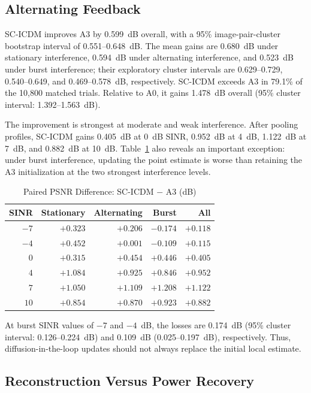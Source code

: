 \documentclass[conference]{IEEEtran}
\newcommand{\method}{SC-ICDM}
\begin{document}
\subsection{Alternating Feedback}

\method{} improves A3 by 0.599~dB overall, with a 95\% image-pair-cluster
bootstrap interval of 0.551--0.648~dB. The mean gains are 0.680~dB under
stationary interference, 0.594~dB under alternating interference, and
0.523~dB under burst interference; their exploratory cluster intervals are
0.629--0.729, 0.540--0.649, and 0.469--0.578~dB, respectively. \method{}
exceeds A3 in 79.1\% of the 10,800 matched trials. Relative to A0, it gains
1.478~dB overall (95\% cluster interval: 1.392--1.563~dB).

The improvement is strongest at moderate and weak interference. After
pooling profiles, \method{} gains 0.405~dB at 0~dB SINR, 0.952~dB at 4~dB,
1.122~dB at 7~dB, and 0.882~dB at 10~dB. Table~\ref{tab:sinr_gain} also
reveals an important exception: under burst interference, updating the point
estimate is worse than retaining the A3 initialization at the two strongest
interference levels.

\begin{table}[t]
\caption{Paired PSNR Difference: \method{} $-$ A3 (dB)}
\label{tab:sinr_gain}
\centering
\setlength{\tabcolsep}{5.0pt}
\begin{tabular}{rrrrr}
\toprule
SINR & Stationary & Alternating & Burst & All \\
\midrule
$-7$ & $+0.323$ & $+0.206$ & $\mathbf{-0.174}$ & $+0.118$ \\
$-4$ & $+0.452$ & $+0.001$ & $\mathbf{-0.109}$ & $+0.115$ \\
$0$  & $+0.315$ & $+0.454$ & $+0.446$ & $+0.405$ \\
$4$  & $+1.084$ & $+0.925$ & $+0.846$ & $+0.952$ \\
$7$  & $+1.050$ & $+1.109$ & $+1.208$ & $+1.122$ \\
$10$ & $+0.854$ & $+0.870$ & $+0.923$ & $+0.882$ \\
\bottomrule
\end{tabular}
\end{table}

At burst SINR values of $-7$ and $-4$~dB, the losses are 0.174~dB
(95\% cluster interval: 0.126--0.224~dB) and 0.109~dB
(0.025--0.197~dB), respectively. Thus, diffusion-in-the-loop updates should
not always replace the initial local estimate.

\subsection{Reconstruction Versus Power Recovery}
\end{document}
